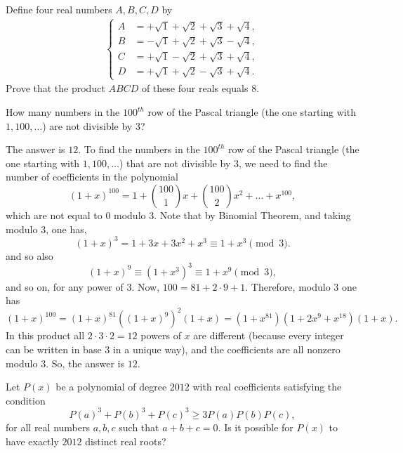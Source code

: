 \documentclass[12pt,a4paper]{memoir}
\theoremstyle{definition}
\begin{document}
\begin{question}
	Define four real numbers $A,B,C,D$ by
	\begin{align*}
		\begin{cases}
			A &= +\sqrt 1+\sqrt 2+\sqrt 3+\sqrt 4,\\
			B &= -\sqrt 1+\sqrt 2+\sqrt 3-\sqrt 4,\\
			C &= +\sqrt 1-\sqrt 2+\sqrt 3+\sqrt 4,\\
			D &= +\sqrt 1+\sqrt 2-\sqrt 3+\sqrt 4.
		\end{cases}
	\end{align*}
	Prove that the product $ABCD$ of these four reals equals $8$.
\end{question}

\begin{question}
	How many numbers in the $100^{th}$ row of the Pascal triangle (the one starting with $1, 100, \dots$) are not divisible by $3$?
\end{question}

\begin{solution}[name=Solution by Boris]
	The answer is $12$. To find the numbers in the $100^{th}$ row of the Pascal triangle (the one starting with $1, 100, \dots$) that are not divisible by $3$, we need to find the number of coefficients in the polynomial
	\[ (1+x)^{100}= 1 + {100\choose 1}x + {100\choose 2}x^2 + \dots + x^{100}, \]
	which are not equal to $0$ modulo $3$. Note that by Binomial Theorem, and taking modulo $3$, one has,
	\[(1+x)^3= 1+ 3x+3x^2+ x^3 \equiv 1+x^3 \pmod 3.\]
	and so also
	\[(1+x)^9 \equiv (1+x^3)^3 \equiv 1+x^9 \pmod 3,\]
	and so on, for any power of $3$. Now, $100= 81+2\cdot 9 + 1$. Therefore, modulo $3$ one has
	\[ (1+x)^{100}= (1+x)^{81} \left((1+x)^9\right)^2 (1+x) =
	(1+x^{81}) (1+ 2x^{9} + x^{18}) (1+x). \]
	In this product all $2\cdot 3 \cdot 2=12 $ powers of $x$ are different (because every integer can be written in base $3$ in a unique way), and the coefficients are all nonzero modulo $3$. So, the answer is $12$.
\end{solution}


\begin{question}[name={2012 Serbia TST}]
	Let $P(x)$ be a polynomial of degree $2012$ with real coefficients satisfying the condition\[P(a)^3 + P(b)^3 + P(c)^3 \geq 3P(a)P(b)P(c),\] for all real numbers $a,b,c$ such that $a+b+c=0$. Is it possible for $P(x)$ to have exactly $2012$ distinct real roots?
\end{question}
\end{document}
